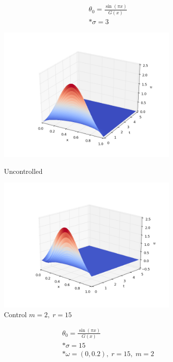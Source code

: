 \documentclass[a4:paper,14pt]{article}
\begin{document}
\begin{gather}
    \theta_0 = \frac{\sin(\pi x)}{G(x)} \\*
    \sigma = 3
\end{gather}


\begin{figure}[h]
\centering
\begin{minipage}{.5\textwidth}
  \centering
  \includegraphics[width=3.5in]{ex_s3}
  \caption{Uncontrolled}
  \label{fig:test1}
\end{minipage}%
\begin{minipage}{.5\textwidth}
  \centering
  \includegraphics[width=3.5in]{re_s3}
  \caption{Control $m = 2, \; r = 15$}
  \label{fig:test2}
\end{minipage}
\end{figure}



\begin{gather}
    \theta_0 = \frac{\sin(\pi x)}{G(x)} \\*
    \sigma = 15 \\*
    \omega = (0, 0.2), \; r = 15, \; m = 2
\end{gather}
\end{document}
